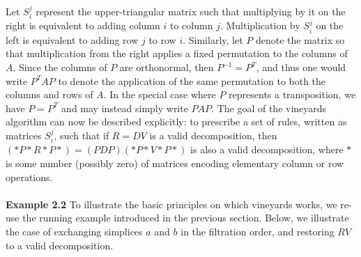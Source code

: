 \documentclass{article} %
\newcommand\topstrut[1][1.1ex]{\setlength\bigstrutjot{#1}{\bigstrut[t]}}
\newcommand\botstrut[1][0.95ex]{\setlength\bigstrutjot{#1}{\bigstrut[b]}}
\begin{document}
Let $S_{i}^j$ represent the upper-triangular matrix such that multiplying by it on the right is equivalent to adding column $i$ to column $j$. 
Multiplication by $S_{i}^j$ on the left is equivalent to adding row $j$ to row $i$.
Similarly, let $P$ denote the matrix so that multiplication from the right applies a fixed permutation to the columns of $A$.
Since the columns of $P$ are orthonormal, then  $P^{-1} = P^T$, and thus one would write $P^T A P$ to denote the application of the same permutation  to both the columns and rows of $A$. In the special case where $P$ represents a transposition, we have $P = P^T$ and may instead simply write $P A P$. 
The goal of the vineyards algorithm can now be described explicitly: to prescribe a set of rules, written as matrices $S_{i}^{j}$, such that if $R = D V$ is a valid decomposition, then $(\ast P \ast R \ast P \ast) = (PDP)(\ast P\ast V \ast P \ast)$ is also a valid decomposition, where $\ast$ is some number (possibly zero) of matrices encoding elementary column or row operations. 
\\
\\
\noindent 
\textbf{Example 2.2} To illustrate the basic principles on which vineyards works, we re-use the running example introduced in the previous section. Below, we illustrate the case of exchanging simplices $a$ and $b$ in the filtration order, and restoring $RV$ to a valid decomposition. 
\end{document}
